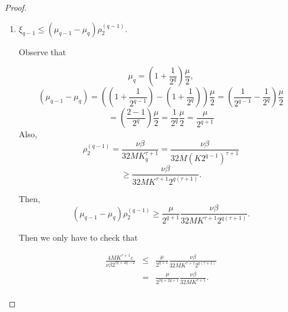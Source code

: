 \begin{proof}
\begin{enumerate}
\begin{itemize}
\begin{enumerate}







\item $\xi_{q-1} \leq (\mu_{q-1}-\mu_{q})\rho_2^{(q-1)}$.

Observe that

$$\mu_q = (1 + \frac{1}{2^q})\frac{\mu}{2},$$
$$(\mu_{q-1} - \mu_q) = ((1 + \frac{1}{2^{q-1}})-(1 + \frac{1}{2^{q}}))\frac{\mu}{2} = (\frac{1}{2^{q-1}} - \frac{1}{2^{q}})\frac{\mu}{2} $$
$$= \left(\frac{2-1}{2^q}\right)\frac{\mu}{2} = \frac{1}{2^q}\frac{\mu}{2} = \frac{\mu}{2^{q+1}}$$
Also,
$$\rho_2^{(q-1)} = \frac{\nu \beta}{32 M K_q^{\tau+1}} = \frac{\nu\beta}{32 M (K 2^{q-1})^{\tau+1}} $$
$$\geq \frac{\nu \beta}{32 M K^{\tau+1} 2^{q(\tau+1)}}.$$

Then,
$$(\mu_{q-1}-\mu_q)\rho_2^{(q-1)} \geq \frac{\mu}{2^{q+1}}\frac{\nu\beta}{32 M K^{\tau+1} 2^{q(\tau+1)}}.$$

Then we only have to check that

$$
\begin{array}{rcl}
\frac{4 M K^{\tau+1}\varepsilon}{\nu \beta 2^{\tau q + 2q -2}} & \leq & \frac{\mu}{2^{q+1}}\frac{\nu \beta}{32 M K^{\tau+1} 2^{q(\tau+1)}}\\
& = & \frac{\mu}{2^{\tau q + 2q +1}}\frac{\nu \beta}{32 M K^{\tau+1} }.\\
\end{array}
$$


\end{enumerate}
\end{itemize}
\end{enumerate}
\end{proof}
